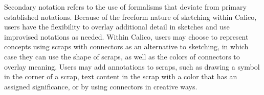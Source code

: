 \documentclass[12pt,fleqn]{ucithesis}
\providecommand{\DIFaddtex}[1]{{\protect\color{blue}\uwave{#1}}} %
\providecommand{\DIFaddbegin}{} %
\providecommand{\DIFaddend}{} %
\providecommand{\DIFdelbegin}{} %
\providecommand{\DIFadd}[1]{\texorpdfstring{\DIFaddtex{#1}}{#1}} %
\begin{document}
Secondary notation refers to the use of formalisms that deviate from primary established notations. Because of the freeform nature of sketching within Calico, users have the flexibility to overlay additional detail in sketches and use improvised notations as needed. Within Calico, users may choose to represent concepts using scraps with connectors as an alternative to \DIFaddbegin \DIFadd{basic }\DIFaddend sketching, in which case they can use the shape of scraps, as well as the colors of connectors to overlay meaning. Users may add annotations to scraps, such as drawing a symbol in the corner of a scrap, text content in the scrap with a color that has an assigned significance, or by using connectors in creative ways.


\DIFdelbegin %



\end{document}
